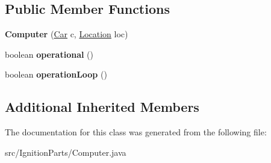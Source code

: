 \subsection*{Public Member Functions}
\begin{DoxyCompactItemize}
\item 
\hypertarget{classIgnitionParts_1_1Computer_a491a5adfba04ac4ba724bab627565d52}{}{\bfseries Computer} (\hyperlink{classCars_1_1Car}{Car} c, \hyperlink{enumEnums_1_1Location}{Location} loc)\label{classIgnitionParts_1_1Computer_a491a5adfba04ac4ba724bab627565d52}

\item 
\hypertarget{classIgnitionParts_1_1Computer_aafdc32452550624dc8c72b3c17868cc9}{}boolean {\bfseries operational} ()\label{classIgnitionParts_1_1Computer_aafdc32452550624dc8c72b3c17868cc9}

\item 
\hypertarget{classIgnitionParts_1_1Computer_a73944eafa798c9bf232d6e7a3c9f9b3f}{}boolean {\bfseries operation\+Loop} ()\label{classIgnitionParts_1_1Computer_a73944eafa798c9bf232d6e7a3c9f9b3f}

\end{DoxyCompactItemize}
\subsection*{Additional Inherited Members}


The documentation for this class was generated from the following file\+:\begin{DoxyCompactItemize}
\item 
src/\+Ignition\+Parts/Computer.\+java\end{DoxyCompactItemize}
